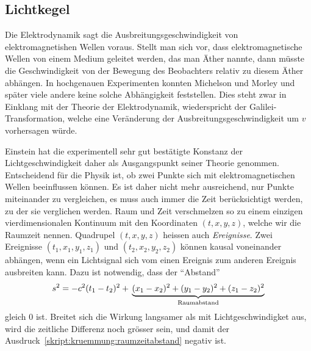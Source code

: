 \subsection{Lichtkegel}
Die Elektrodynamik sagt die Ausbreitungsgeschwindigkeit von
elektromagnetishen Wellen voraus.
Stellt man sich vor, dass elektromagnetische Wellen von einem
Medium geleitet werden, das man Äther nannte, dann müsste die
Geschwindigkeit von der Bewegung des Beobachters relativ zu
diesem Äther abhängen.
In hochgenauen Experimenten konnten Michelson und Morley und später
viele andere keine solche Abhängigkeit feststellen.
Dies steht zwar in Einklang mit der Theorie der Elektrodynamik,
wiederspricht der Galilei-Transformation, welche eine Veränderung
der Ausbreitungsgeschwindigkeit um $v$ vorhersagen würde.

Einstein hat die experimentell sehr gut bestätigte Konstanz der
Lichtgeschwindigkeit daher als Ausgangspunkt seiner Theorie genommen.
Entscheidend für die Physik ist, ob zwei Punkte sich mit elektromagnetischen
Wellen beeinflussen können.
Es ist daher nicht mehr ausreichend, nur Punkte miteinander zu vergleichen,
es muss auch immer die Zeit berücksichtigt werden, zu der sie verglichen
werden.
Raum und Zeit verschmelzen so zu einem einzigen vierdimensionalen
Kontinuum mit den Koordinaten $(t,x,y,z)$, welche wir die Raumzeit
nennen.
Quadrupel $(t,x,y,z)$ heissen auch {\em Ereignisse}.
Zwei Ereignisse $(t_1,x_1,y_1,z_1)$ und $(t_2,x_2,y_2,z_2)$ können
kausal voneinander abhängen, wenn ein Lichtsignal sich vom einen Ereignis
zum anderen Ereignis ausbreiten kann.
Dazu ist notwendig, dass der ``Abstand''
\begin{equation}
s^2
=
-c^2(t_1-t_2)^2
+
\mathstrut
\underbrace{
(x_1-x_2)^2
+
(y_1-y_2)^2
+
(z_1-z_2)^2}_{\text{Raumabstand}}
\label{skript:kruemmung:raumzeitabstand}
\end{equation}
gleich $0$ ist.
Breitet sich die Wirkung langsamer als mit Lichtgeschwindigket aus,
wird die zeitliche Differenz noch grösser sein, und damit der
Ausdruck~\eqref{skript:kruemmung:raumzeitabstand} negativ ist.

